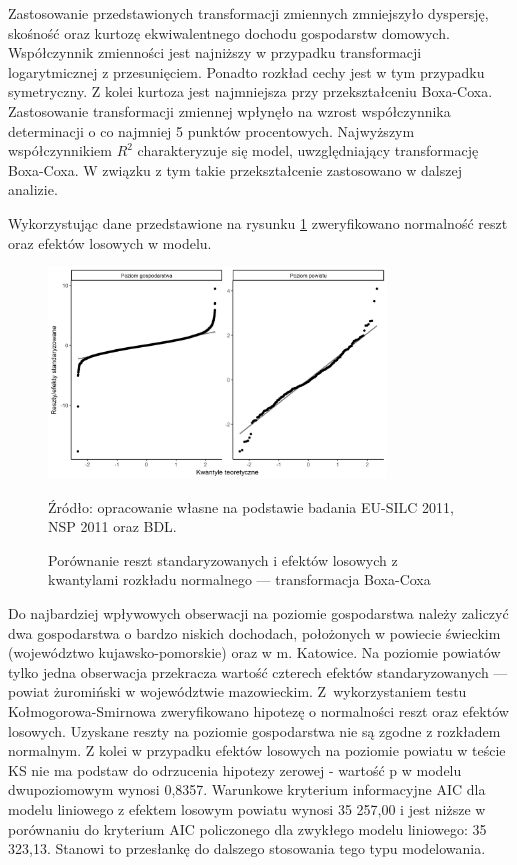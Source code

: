Zastosowanie przedstawionych transformacji zmiennych zmniejszyło dyspersję, skośność oraz kurtozę ekwiwalentnego dochodu gospodarstw domowych. Współczynnik zmienności jest najniższy w przypadku transformacji logarytmicznej z przesunięciem. Ponadto rozkład cechy jest w tym przypadku symetryczny. Z kolei kurtoza jest najmniejsza przy przekształceniu Boxa-Coxa. Zastosowanie transformacji zmiennej wpłynęło na wzrost współczynnika determinacji o co najmniej 5 punktów procentowych. Najwyższym współczynnikiem $R^2$ charakteryzuje się model, uwzględniający transformację Boxa-Coxa. W związku z tym takie przekształcenie zastosowano w dalszej analizie.

Wykorzystując dane przedstawione na rysunku \ref{fig:bxcx_norm_lvl1} zweryfikowano normalność reszt oraz efektów losowych w modelu.

\begin{figure}[htp]
\centering
\includegraphics[width=0.8\textwidth]{04_wykresy/bxcx_norm_lvl1-1.png}
\caption{Porównanie reszt standaryzowanych i efektów losowych z kwantylami rozkładu normalnego --- transformacja Boxa-Coxa}
\small{Źródło: opracowanie własne na podstawie badania EU-SILC 2011, NSP 2011 oraz BDL.}
\label{fig:bxcx_norm_lvl1}
\end{figure}

Do najbardziej wpływowych obserwacji na poziomie gospodarstwa należy zaliczyć dwa gospodarstwa o bardzo niskich dochodach, położonych w powiecie świeckim (województwo kujawsko-pomorskie) oraz w m. Katowice. Na poziomie powiatów tylko jedna obserwacja przekracza wartość czterech efektów standaryzowanych --- powiat żuromiński w województwie mazowieckim. Z~wykorzystaniem testu Kołmogorowa-Smirnowa zweryfikowano hipotezę o normalności reszt oraz efektów losowych. Uzyskane reszty na poziomie gospodarstwa nie są zgodne z rozkładem normalnym. Z kolei w przypadku efektów losowych na poziomie powiatu w teście KS nie ma podstaw do odrzucenia hipotezy zerowej - wartość p w modelu dwupoziomowym wynosi 0,8357. Warunkowe kryterium informacyjne AIC \citep{caic2014} dla modelu liniowego z efektem losowym powiatu wynosi 35 257,00 i jest niższe w porównaniu do kryterium AIC policzonego dla zwykłego modelu liniowego: 35 323,13. Stanowi to przesłankę do dalszego stosowania tego typu modelowania.

